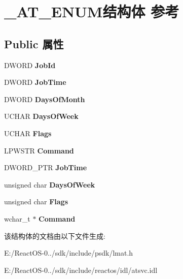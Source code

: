 \hypertarget{struct___a_t___e_n_u_m}{}\section{\+\_\+\+A\+T\+\_\+\+E\+N\+U\+M结构体 参考}
\label{struct___a_t___e_n_u_m}
\subsection*{Public 属性}
\begin{DoxyCompactItemize}
\item 
\mbox{\label{struct___a_t___e_n_u_m_a2d72278c87bdb62692449514a9cf64e3}} 
D\+W\+O\+RD {\bfseries Job\+Id}
\item 
\mbox{\label{struct___a_t___e_n_u_m_a6cf9a5fdbc0a97bb7ad01120b843b656}} 
D\+W\+O\+RD {\bfseries Job\+Time}
\item 
\mbox{\label{struct___a_t___e_n_u_m_af3f9e98f66f2b3fe5ed9fc3551545c2b}} 
D\+W\+O\+RD {\bfseries Days\+Of\+Month}
\item 
\mbox{\label{struct___a_t___e_n_u_m_a9fdb8d23f7a46974e727c6fe9f5c6d86}} 
U\+C\+H\+AR {\bfseries Days\+Of\+Week}
\item 
\mbox{\label{struct___a_t___e_n_u_m_addf6919b4e1b07625d28bc37a0ea43f7}} 
U\+C\+H\+AR {\bfseries Flags}
\item 
\mbox{\label{struct___a_t___e_n_u_m_a9f02dfbcff3e11cb4e6007dd80646875}} 
L\+P\+W\+S\+TR {\bfseries Command}
\item 
\mbox{\label{struct___a_t___e_n_u_m_a4bbaf08b8ad76f60c23d900f95e5f175}} 
D\+W\+O\+R\+D\+\_\+\+P\+TR {\bfseries Job\+Time}
\item 
\mbox{\label{struct___a_t___e_n_u_m_aa6ca494b396b9a7626fc02b19f898ff2}} 
unsigned char {\bfseries Days\+Of\+Week}
\item 
\mbox{\label{struct___a_t___e_n_u_m_af6e4b0cd2767505a35d50af0b61acc05}} 
unsigned char {\bfseries Flags}
\item 
\mbox{\label{struct___a_t___e_n_u_m_a0e467e183aebd8499c4f52030ca11e0c}} 
wchar\+\_\+t $\ast$ {\bfseries Command}
\end{DoxyCompactItemize}


该结构体的文档由以下文件生成\+:\begin{DoxyCompactItemize}
\item 
E\+:/\+React\+O\+S-\/0../sdk/include/psdk/lmat.\+h\item 
E\+:/\+React\+O\+S-\/0../sdk/include/reactos/idl/atsvc.\+idl\end{DoxyCompactItemize}
